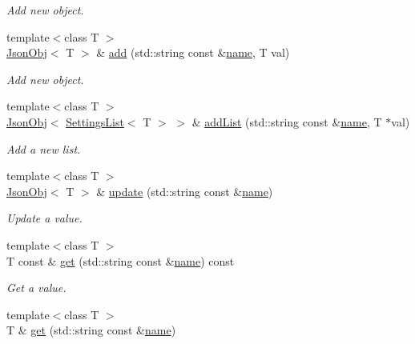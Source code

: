 \begin{DoxyCompactItemize}
\begin{DoxyCompactList}\small\item\em Add new object. \end{DoxyCompactList}\item 
{\footnotesize template$<$class T $>$ }\\\hyperlink{class_json_obj}{Json\+Obj}$<$ T $>$ \& \hyperlink{class_settings_json_a1a26fd210c68d89a10996d95e82561e8}{add} (std\+::string const \&\hyperlink{class_settings_json_a301eda8c47d1140298fade3907c723d6}{name}, T val)
\begin{DoxyCompactList}\small\item\em Add new object. \end{DoxyCompactList}\item 
{\footnotesize template$<$class T $>$ }\\\hyperlink{class_json_obj}{Json\+Obj}$<$ \hyperlink{class_settings_list}{Settings\+List}$<$ T $>$ $>$ \& \hyperlink{class_settings_json_a5c95aa5367813289491b4380e2902067}{add\+List} (std\+::string const \&\hyperlink{class_settings_json_a301eda8c47d1140298fade3907c723d6}{name}, T $\ast$val)
\begin{DoxyCompactList}\small\item\em Add a new list. \end{DoxyCompactList}\item 
{\footnotesize template$<$class T $>$ }\\\hyperlink{class_json_obj}{Json\+Obj}$<$ T $>$ \& \hyperlink{class_settings_json_ae11e812ff606270e59007c1000c7434c}{update} (std\+::string const \&\hyperlink{class_settings_json_a301eda8c47d1140298fade3907c723d6}{name})
\begin{DoxyCompactList}\small\item\em Update a value. \end{DoxyCompactList}\item 
{\footnotesize template$<$class T $>$ }\\T const  \& \hyperlink{class_settings_json_a6c600f3c639d8e67cdf3060e16904dcc}{get} (std\+::string const \&\hyperlink{class_settings_json_a301eda8c47d1140298fade3907c723d6}{name}) const
\begin{DoxyCompactList}\small\item\em Get a value. \end{DoxyCompactList}\item 
{\footnotesize template$<$class T $>$ }\\T \& \hyperlink{class_settings_json_a55879571926455d789d0523627408f0c}{get} (std\+::string const \&\hyperlink{class_settings_json_a301eda8c47d1140298fade3907c723d6}{name})

\end{DoxyCompactItemize}
